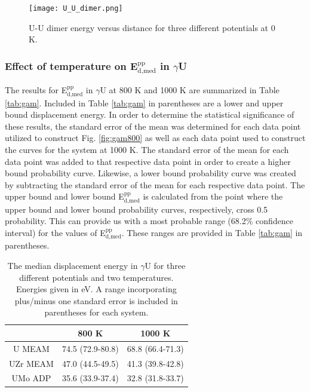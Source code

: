\documentclass[review]{elsarticle}
\begin{document}
\begin{figure}[h]
 \centering
 \texttt{[image: U\_U\_dimer.png]} 
 \caption{U-U dimer energy versus distance for three different potentials at 0 K.}
 \label{fig:dimer}
\end{figure}


\subsubsection{Effect of temperature on E$^{\textrm{pp}}_{\textrm{d,med}}$ in $\gamma$U}

The results for E$^{\textrm{pp}}_{\textrm{d,med}}$ in $\gamma$U at 800 K and 1000 K are summarized in Table \ref{tab:gam}. Included in Table \ref{tab:gam} in parentheses are a lower and upper bound displacement energy. In order to determine the statistical significance of these results, the standard error of the mean was determined for each data point utilized to construct Fig. \ref{fig:gam800} as well as each data point used to construct the curves for the system at 1000 K. The standard error of the mean for each data point was added to that respective data point in order to create a higher bound probability curve. Likewise, a lower bound probability curve was created by subtracting the standard error of the mean for each respective data point. The upper bound and lower bound E$^{\textrm{pp}}_{\textrm{d,med}}$ is calculated from the point where the upper bound and lower bound probability curves, respectively, cross 0.5 probability. This can provide us with a most probable range (68.2\% confidence interval) for the values of E$^{\textrm{pp}}_{\textrm{d,med}}$. These ranges are provided in Table \ref{tab:gam} in parentheses. 

\begin{table}[h]
\caption{The median displacement energy in $\gamma$U for three different potentials and two temperatures. Energies given in eV. A range incorporating plus/minus one standard error is included in parentheses for each system.} \label{tab:gam}
\begin{center}
\begin{tabular}{|c|c|c|}
	\hline
	& 800 K & 1000 K \\
	 \hline
	 U MEAM & 74.5 (72.9-80.8) & 68.8 (66.4-71.3) \\
	 UZr MEAM & 47.0 (44.5-49.5) & 41.3 (39.8-42.8) \\
	 UMo ADP & 35.6 (33.9-37.4) & 32.8 (31.8-33.7) \\
	 \hline
\end{tabular}
\end{center}
\label{default}
\end{table}
\end{document}
